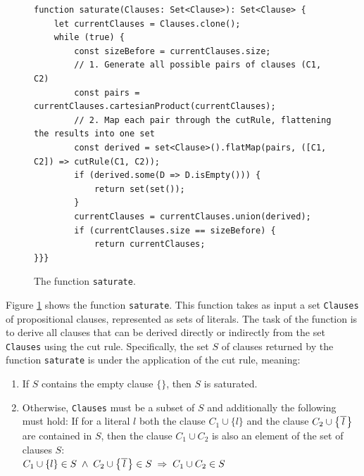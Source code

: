 \begin{figure}[!ht]
\centering
\begin{verbatim}
function saturate(Clauses: Set<Clause>): Set<Clause> {
    let currentClauses = Clauses.clone(); 
    while (true) {
        const sizeBefore = currentClauses.size;
        // 1. Generate all possible pairs of clauses (C1, C2)
        const pairs = currentClauses.cartesianProduct(currentClauses);
        // 2. Map each pair through the cutRule, flattening the results into one set
        const derived = set<Clause>().flatMap(pairs, ([C1, C2]) => cutRule(C1, C2));
        if (derived.some(D => D.isEmpty())) {
            return set(set());
        }
        currentClauses = currentClauses.union(derived);
        if (currentClauses.size == sizeBefore) {
            return currentClauses;
}}}
\end{verbatim}
\vspace*{-0.3cm}
\caption{The function \texttt{saturate}.}
\label{fig:Completeness.ipynb-2}
\end{figure}
Figure \ref{fig:Completeness.ipynb-2} shows the function \texttt{saturate}. This function takes
as input a set \texttt{Clauses} of propositional clauses, represented as sets of literals.
The task of the function is to derive all clauses that can be derived directly or indirectly from the set \texttt{Clauses}
using the cut rule. Specifically, the set $S$ of clauses returned by the function \texttt{saturate}
is  under the application of the cut rule, meaning:

\begin{enumerate}
\item If $S$ contains the empty clause $\{\}$, then $S$ is saturated.
\item Otherwise, \texttt{Clauses} must be a subset of $S$ and additionally the following must hold:
      If for a literal $l$ both the clause $C_1 \cup \{ l \}$ and the clause $C_2 \cup
      \bigl\{ \overline{\,l\,} \bigr\}$ are contained in $S$,
      then the clause $C_1 \cup C_2$ is also an element of the set of clauses $S$:
      \\[0.2cm]
      \hspace*{1.3cm}
      $C_1 \cup \{ l \} \in S \;\wedge\; C_2 \cup \bigl\{ \overline{\,l\,} \bigr\} \in S \;\Rightarrow\; C_1 \cup C_2 \in S$
\end{enumerate}

